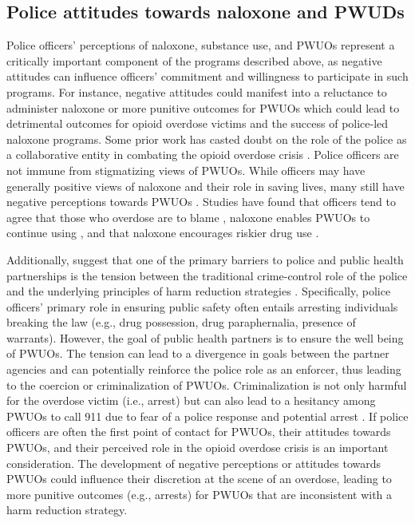 \subsection{Police attitudes towards naloxone and PWUDs}
Police officers’ perceptions of naloxone, substance use, and PWUOs represent a critically important component of the programs described above, as negative attitudes can influence officers’ commitment and willingness to participate in such programs. For instance, negative attitudes could manifest into a reluctance to administer naloxone or more punitive outcomes for PWUOs which could lead to detrimental outcomes for opioid overdose victims and the success of police-led naloxone programs. Some prior work has casted doubt on the role of the police as a collaborative entity in combating the opioid overdose crisis \parencite{carroll_police_2023}. Police officers are not immune from stigmatizing views of PWUOs. While officers may have generally positive views of naloxone and their role in saving lives, many still have negative perceptions towards PWUOs \parencite{barry_stigma_2014, calabrese_opposition_2019}. Studies have found that officers tend to agree that those who overdose are to blame \parencite{beletsky_attitudes_2005, wagner_training_2016}, naloxone enables PWUOs to continue using \parencite{banta-green_police_2013, burris_stopping_2009, reichert_police_2023}, and that naloxone encourages riskier drug use \parencite{saunders_you_2019}. 

Additionally, \textcite{carroll_police_2023} suggest that one of the primary barriers to police and public health partnerships is the tension between the traditional crime-control role of the police and the underlying principles of harm reduction strategies \parencite{wright_aiding_2024}. Specifically, police officers' primary role in ensuring public safety often entails arresting individuals breaking the law (e.g., drug possession, drug paraphernalia, presence of warrants). However, the goal of public health partners is to ensure the well being of PWUOs. The tension can lead to a divergence in goals between the partner agencies and can potentially reinforce the police role as an enforcer, thus leading to the coercion or criminalization of PWUOs. Criminalization is not only harmful for the overdose victim (i.e., arrest) but can also lead to a hesitancy among PWUOs to call 911 due to fear of a police response and potential arrest \parencite{bohnert_policing_2011}. If police officers are often the first point of contact for PWUOs, their attitudes towards PWUOs, and their perceived role in the opioid overdose crisis is an important consideration. The development of negative perceptions or attitudes towards PWUOs could influence their discretion at the scene of an overdose, leading to more punitive outcomes (e.g., arrests) for PWUOs that are inconsistent with a harm reduction strategy.

